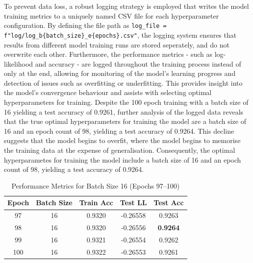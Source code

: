 \documentclass[11pt]{article}
\begin{document}
To prevent data loss, a robust logging strategy is employed that writes the model training metrics to a uniquely named CSV file for each hyperparameter configuration. 
By defining the file path as \texttt{log\_file = f"log/log\_b\{batch\_size\}\_e\{epochs\}.csv"}, the logging system ensures that results from different model training runs are stored seperately, and do not overwrite each other.
Furthermore, the performance metrics - such as log-likelihood and accuracy - are logged throughout the training process instead of only at the end, allowing for monitoring of the model's learning progress and detection of issues such as overfitting or underfitting.
This provides insight into the model's convergence behaviour and assists with selecting optimal hyperparameters for training.
Despite the 100 epoch training with a batch size of 16 yielding a test accuracy of 0.9261, further analysis of the logged data reveals that the true optimal hyperparameters for training the model are a batch size of 16 and an epoch count of 98, yielding a test accuracy of 0.9264. 
This decline suggests that the model begins to overfit, where the model begins to memorise the training data at the expense of generalisation. Consequently, the optimal hyperparametes for training the model include a batch size of 16 and an 
epoch count of 98, yielding a test accuracy of 0.9264.

\begin{table}[h]
\centering
\caption{Performance Metrics for Batch Size 16 (Epochs 97--100)}
\label{tab:convergence_detail}
\begin{tabular}{ccccc}
\toprule
\textbf{Epoch} & \textbf{Batch Size} & \textbf{Train Acc} & \textbf{Test LL} & \textbf{Test Acc} \\ 
\midrule
97  & 16 & 0.9320 & -0.26558 & 0.9263 \\
98  & 16 & 0.9320 & -0.26556 & \textbf{0.9264} \\
99  & 16 & 0.9321 & -0.26554 & 0.9262 \\
100 & 16 & 0.9322 & -0.26553 & 0.9261 \\
\bottomrule
\end{tabular}
\end{table}

\newpage
\end{document}
